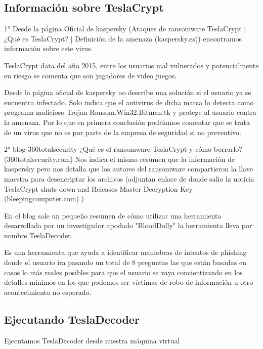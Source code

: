 \documentclass[stu, 11pt, letterpaper, donotrepeattitle, floatsintext, natbib]{apa7}
\begin{document}
\subsection{Información sobre TeslaCrypt} 

1° Desde la página Oficial de kaspersky (Ataques de ransomware TeslaCrypt | ¿Qué es TeslaCrypt? | Definición de la amenaza (kaspersky.es)) encontramos información sobre este virus.

TeslaCrypt data del año 2015, entre los usuarios mal vulnerados y potencialmente en riesgo se comenta que son jugadores de video juegos.

Desde la página oficial de kaspersky no describe una solución si el usuario ya se encuentra infectado. Solo indica que el antivirus de dicha marca lo detecta como programa malicioso Trojan-Ransom.Win32.Bitman.tk y protege al usuario contra la amenaza. Por lo que en primera conclusión podríamos comentar que se trata de un virus que no es por parte de la empresa de seguridad si no preventivo. 

2° blog 360totalsecurity ¿Qué es el ransomware TeslaCrypt y cómo borrarlo? (360totalsecurity.com) Nos indica el mismo resumen que la información de kaspersky pero nos detalla que los autores del ransomware compartieron la llave maestra para desencriptar los archivos (adjuntan enlace de donde salio la noticia TeslaCrypt shuts down and Releases Master Decryption Key (bleepingcomputer.com) )

En el blog sale un pequeño resumen de cómo utilizar una herramienta desarrollada por un investigador apodado "BloodDolly" la herramienta lleva por nombre TeslaDecoder.


Es una herramienta que ayuda a identificar maniobras de intentos de phishing donde el usuario ira pasando un total de 8 preguntas las que están basadas en casos lo más reales posibles para que el usuario se vaya concientizando en los detalles mínimos en los que podemos ser víctimas de robo de información u otro acontecimiento no esperado.

\subsection{Ejecutando TeslaDecoder} 

Ejecutamos TeslaDecoder desde nuestra máquina virtual
\end{document}
